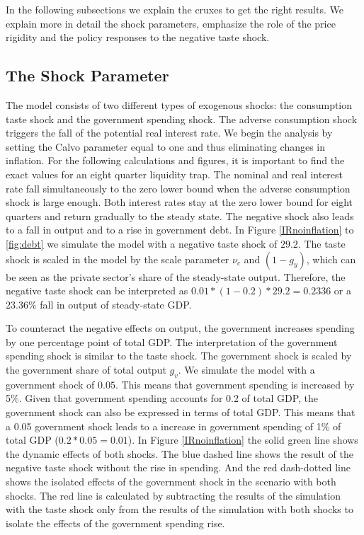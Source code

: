 \documentclass[12pt,a4paper,oneside,titlepage]{article}
\begin{document}
In the following subsections we explain the cruxes to get the right results. We explain more in detail the shock parameters, emphasize the role of the price rigidity and the policy responses to the negative taste shock.


\subsection*{The Shock Parameter}
The model consists of two different types of exogenous shocks: the consumption taste shock and the government spending shock. The adverse consumption shock triggers the fall of the potential real interest rate. We begin the analysis by setting the Calvo parameter equal to one and thus eliminating changes in inflation. For the following calculations and figures, it is important to find the exact values for an eight quarter liquidity trap. The nominal and real interest rate fall simultaneously to the zero lower bound when the adverse consumption shock is large enough. Both interest rates stay at the zero lower bound for eight quarters and return  gradually to the steady state. The negative shock also leads to a fall in output and to a rise in government debt. In Figure \ref{IRnoinflation} to \ref{fig:debt} we simulate the model with a negative taste shock of $29.2$. The taste shock is scaled in the model by the scale parameter $\nu_c$ and $\left(1- g_y\right)$, which can be seen as the private sector’s share of the steady-state output. Therefore, the negative taste shock can be interpreted as $0.01 * \left(1-0.2\right) * 29.2 = 0.2336$ or a $23.36\%$ fall in output of steady-state GDP.
\par
\bigskip
To counteract the negative effects on output, the government increases spending by one percentage point of total GDP. The interpretation of the government spending shock is similar to the taste shock.  The government shock is scaled by the government share of total output $g_v$. We simulate the model with a government shock of $0.05$. This means that government spending is increased by 5\%. Given that government spending accounts for 0.2 of total GDP, the government shock can also be expressed in terms of total GDP. This means that a 0.05 government shock leads to a increase in government spending of 1\% of total GDP ($0.2 * 0.05 = 0.01$).
In Figure \ref{IRnoinflation} the solid green line shows the dynamic effects of both shocks. The blue dashed line shows the result of the negative taste shock without the rise in spending. And the red dash-dotted line shows the isolated effects of the government shock in the scenario with both shocks. The red line is calculated by subtracting the results of the simulation with the taste shock only from the results of the simulation with both shocks to isolate the effects of the government spending rise.
\end{document}
